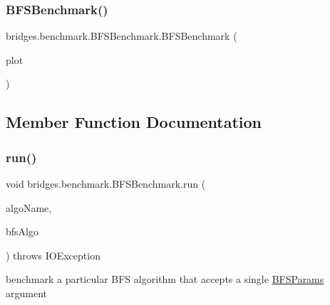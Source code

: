 \mbox{\label{classbridges_1_1benchmark_1_1_b_f_s_benchmark_afe4a4dd46295e41c1cb7ee25c616a2c9}} 
\subsubsection{\texorpdfstring{B\+F\+S\+Benchmark()}{BFSBenchmark()}\hspace{0.1cm}{\footnotesize\ttfamily [2/2]}}
{\footnotesize\ttfamily bridges.\+benchmark.\+B\+F\+S\+Benchmark.\+B\+F\+S\+Benchmark (\begin{DoxyParamCaption}\item[{\mbox{\hyperlink{classbridges_1_1base_1_1_line_chart}{Line\+Chart}}}]{plot }\end{DoxyParamCaption})}



\subsection{Member Function Documentation}
\mbox{\label{classbridges_1_1benchmark_1_1_b_f_s_benchmark_a0f530ad46a8a379b86285e0efcf8d51c}} 
\subsubsection{\texorpdfstring{run()}{run()}}
{\footnotesize\ttfamily void bridges.\+benchmark.\+B\+F\+S\+Benchmark.\+run (\begin{DoxyParamCaption}\item[{String}]{algo\+Name,  }\item[{Consumer$<$ \mbox{\hyperlink{classbridges_1_1benchmark_1_1_b_f_s_params}{B\+F\+S\+Params}} $>$}]{bfs\+Algo }\end{DoxyParamCaption}) throws I\+O\+Exception}



benchmark a particular B\+FS algorithm that accepts a single \mbox{\hyperlink{classbridges_1_1benchmark_1_1_b_f_s_params}{B\+F\+S\+Params}} argument 


